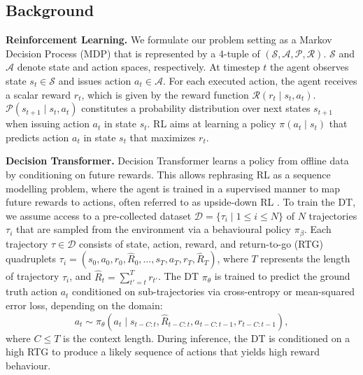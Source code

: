 \documentclass{article} %
\begin{document}
\subsection{Background}
\textbf{Reinforcement Learning.} 
We formulate our problem setting as a Markov Decision Process (MDP) that is represented by a 4-tuple of $(\mathcal{S},\mathcal{A},\mathcal{P},\mathcal{R})$. 
$\mathcal{S}$ and $\mathcal{A}$ denote state and action spaces, respectively.
At timestep $t$ the agent observes state $s_t \in \mathcal{S}$ and issues action $a_t \in \mathcal{A}$.
For each executed action, the agent receives a scalar reward $r_t$, which is given by the reward function $\mathcal{R}(r_t \mid s_t, a_t)$.
$\mathcal{P}(s_{t+1}\mid s_t, a_t)$ constitutes a probability distribution over next states $s_{t+1}$ when issuing action $a_t$ in state $s_t$.
RL aims at learning a policy $\pi(a_t\mid s_t)$ that predicts action $a_t$ in state $s_t$ that maximizes $r_t$.

\textbf{Decision Transformer.} 
Decision Transformer \citep[DT]{Chen:21} learns a policy from offline data by conditioning on future rewards.
This allows rephrasing RL as a sequence modelling problem, where the agent is trained in a supervised manner to map future rewards to actions, often referred to as upside-down RL \citep{Schmidhuber:19}.
To train the DT, we assume access to a pre-collected dataset $\mathcal{D}=\{\tau_i \mid 1 \leq i \leq N \}$ of $N$ trajectories $\tau_i$ that are sampled from the environment via a behavioural policy $\pi_\beta$.
Each trajectory $\tau \in \mathcal{D}$ consists of state, action, reward, and return-to-go (RTG) quadruplets $\tau_i=(s_0, a_0, r_0, \hat{R}_0, \ldots, s_T, a_T, r_T, \hat{R}_T)$, where $T$ represents the length of trajectory $\tau_i$, and $\hat{R}_t = \sum_{t'=t}^T r_{t'}$.
The DT $\pi_\theta$ is trained to predict the ground truth action $a_t$ conditioned on sub-trajectories via cross-entropy or mean-squared error loss, depending on the domain:
\begin{equation}
  a_t \sim \pi_{\theta} (a_t \mid s_{t-C: t}, \hat R_{t-C:t}, a_{t-C:t-1}, r_{t-C:t-1}), 
\end{equation}
where $C \leq T$ is the context length.
During inference, the DT is conditioned on a high RTG to produce a likely sequence of actions that yields high reward behaviour.
\end{document}

